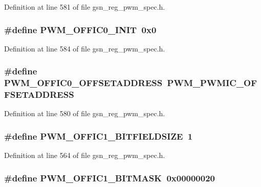 Definition at line 581 of file gsn\_\-reg\_\-pwm\_\-spec.h.

\hypertarget{a00565_ab445c0b98ac492ac0e23ed74252c3b62}{
\subsubsection[{PWM\_\-OFFIC0\_\-INIT}]{\setlength{\rightskip}{0pt plus 5cm}\#define PWM\_\-OFFIC0\_\-INIT~0x0}}
\label{a00565_ab445c0b98ac492ac0e23ed74252c3b62}


Definition at line 584 of file gsn\_\-reg\_\-pwm\_\-spec.h.

\hypertarget{a00565_a86d4d70c23c0eda27e2b2f3fdafd9fe5}{
\subsubsection[{PWM\_\-OFFIC0\_\-OFFSETADDRESS}]{\setlength{\rightskip}{0pt plus 5cm}\#define PWM\_\-OFFIC0\_\-OFFSETADDRESS~PWM\_\-PWMIC\_\-OFFSETADDRESS}}
\label{a00565_a86d4d70c23c0eda27e2b2f3fdafd9fe5}


Definition at line 580 of file gsn\_\-reg\_\-pwm\_\-spec.h.

\hypertarget{a00565_a389bbb6e06ce4364b917a97c7cf8c7e1}{
\subsubsection[{PWM\_\-OFFIC1\_\-BITFIELDSIZE}]{\setlength{\rightskip}{0pt plus 5cm}\#define PWM\_\-OFFIC1\_\-BITFIELDSIZE~1}}
\label{a00565_a389bbb6e06ce4364b917a97c7cf8c7e1}


Definition at line 564 of file gsn\_\-reg\_\-pwm\_\-spec.h.

\hypertarget{a00565_a51c063c90cab4885e923fbfe8ca2df66}{
\subsubsection[{PWM\_\-OFFIC1\_\-BITMASK}]{\setlength{\rightskip}{0pt plus 5cm}\#define PWM\_\-OFFIC1\_\-BITMASK~0x00000020}}
\label{a00565_a51c063c90cab4885e923fbfe8ca2df66}


